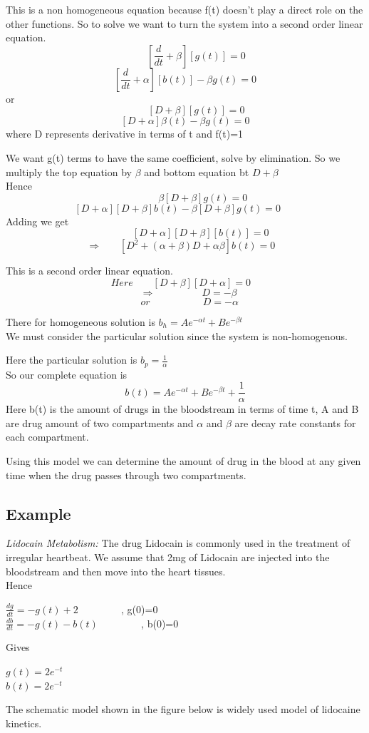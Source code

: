 \par This is a non homogeneous equation because f(t) doesn't play a direct role on the other functions. So to solve we want to turn the system into a second order linear equation.
$$~~~~~~~~~~[\frac{d}{dt}+\beta][g(t)]=0$$
$$[\frac{d}{dt}+\alpha][b(t)]-\beta g(t)=0$$
or 
$$~~~~~~~~~~[D+\beta][g(t)]=0$$
$$[D+\alpha]\beta(t)-\beta g(t)=0$$
where D represents derivative in terms of t and f(t)=1

\par We want g(t) terms to have the same coefficient, solve by elimination. So we multiply the top equation by $\beta$ and bottom equation bt $D+\beta$
\\Hence $$ ~~~~~~~~~~~~~~~~\beta[D+\beta]g(t)=0$$
$$[D+\alpha][D+\beta]b(t)-\beta [D+\beta]g(t)=0~~~~~~~$$
Adding we get $$~~~~~~~~~~~~~~[D+\alpha][D+\beta][b(t)]=0$$
$$ \Rightarrow  ~~~~~~~~[D^{2}+(\alpha +\beta)D+\alpha \beta]b(t)=0~~~~$$

This is a second order linear equation.~\\
 $$Here~~~~~~~~~[D+\beta][D+\alpha]=0~~~~$$
$$~~~\Rightarrow~~~~~~~~~~~~~~~~~~~~~ D=-\beta$$  $$~~~~or~~~~~~~~~~~~~~~~~~~~~~~~D=-\alpha$$

There for homogeneous solution is $b_{h}=Ae^{-\alpha t}+Be^{-\beta t}$ \\
We must consider the particular solution since the system is non-homogenous.
\par Here the particular solution is $b_{p}=\frac{1}{\alpha}$\\
So our complete equation is $$b(t)=Ae^{-\alpha t}+Be^{-\beta t}+\frac{1}{\alpha}$$
Here b(t) is the amount of drugs in the bloodstream in terms of time t, A and B are drug amount of two compartments and $\alpha$ and $\beta$ are decay rate constants for each compartment.
\par Using this model we can determine the amount of drug in the blood at any given time when the drug passes through two compartments.

\subsection*{Example}
\textit{{\Large Lidocain Metabolism:}} The drug Lidocain is commonly used in the treatment of irregular heartbeat. We assume that 2mg of Lidocain are injected into the bloodstream and then move into the heart tissues.
\\Hence \begin{center}
	
	$\frac{dg}{dt}=-g(t)+2~~~~~~~~~~~~~~~~~~$ ,     
	g(0)=0  \\
	$\frac{db}{dt}=-g(t)-b(t)~~~~~~~~~~~~~~~~~~$        ,      b(0)=0
\end{center} 
Gives
\begin{center}
	$g(t)=2e^{-t}$ \\
	$b(t)=2e^{-t}$
\end{center}
The schematic model shown in the figure below is widely used model of lidocaine kinetics.

